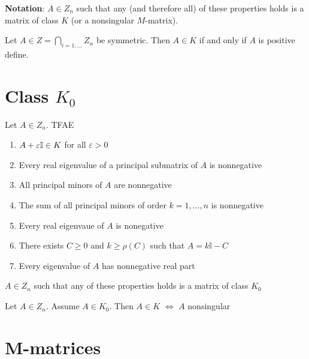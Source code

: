 \documentclass[aspectratio=169]{beamer}
\begin{document}
\begin{frame}
\textbf{Notation}: $A\in Z_n$ such that any (and therefore all) of these properties holds is a matrix of class $K$ (or a nonsingular $M$-matrix). \\
\vfill
\begin{theorem}
Let $A\in Z= \bigcap\limits_{i=1, \dots}Z_n$ be symmetric. Then $A\in K$ if and only if $A$ is positive define.
\end{theorem}
\end{frame}



\section{Class $K_0$}
\begin{frame}
\begin{theorem}
Let $A\in Z_n$. TFAE
\begin{enumerate}
    \item $A+\varepsilon \mathbb{I}\in K$ for all $\varepsilon>0$
    \item Every real eigenvalue of a principal submatrix of $A$ is nonnegative
    \item All principal minors of $A$ are nonnegative
    \item The sum of all principal minors of order $k= 1, \dots, n$ is nonnegative
    \item Every real eigenvaue of $A$ is nonegative
    \item There exists $C\geq 0$ and $k\geq \rho(C)$ such that $A= k \mathbb{I}-C$
    \item Every eigenvalue of $A$ has nonnegative real part
\end{enumerate}
$A\in Z_n$ such that any of these properties holds is a matrix of class $K_0$
\end{theorem}
\vfill
\begin{theorem}
Let $A\in Z_n$. Assume $A\in K_0$. Then $A\in K$ $\iff$ $A$ nonsingular
\end{theorem}
\end{frame}

\section{M-matrices}
\end{document}
